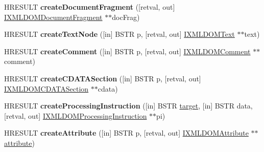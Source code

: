 \begin{DoxyCompactItemize}
H\+R\+E\+S\+U\+LT {\bfseries create\+Document\+Fragment} (\mbox{[}retval, out\mbox{]} \hyperlink{interface_m_s_x_m_l2_1_1_i_x_m_l_d_o_m_document_fragment}{I\+X\+M\+L\+D\+O\+M\+Document\+Fragment} $\ast$$\ast$doc\+Frag)
\item 
\mbox{\label{interface_m_s_x_m_l2_1_1_i_x_m_l_d_o_m_document_ac4424718d50e4d0721b1f1a271591a87}} 
H\+R\+E\+S\+U\+LT {\bfseries create\+Text\+Node} (\mbox{[}in\mbox{]} B\+S\+TR p, \mbox{[}retval, out\mbox{]} \hyperlink{interface_m_s_x_m_l2_1_1_i_x_m_l_d_o_m_text}{I\+X\+M\+L\+D\+O\+M\+Text} $\ast$$\ast$text)
\item 
\mbox{\label{interface_m_s_x_m_l2_1_1_i_x_m_l_d_o_m_document_ad999e03cc035339b43c70ee55877a536}} 
H\+R\+E\+S\+U\+LT {\bfseries create\+Comment} (\mbox{[}in\mbox{]} B\+S\+TR p, \mbox{[}retval, out\mbox{]} \hyperlink{interface_m_s_x_m_l2_1_1_i_x_m_l_d_o_m_comment}{I\+X\+M\+L\+D\+O\+M\+Comment} $\ast$$\ast$comment)
\item 
\mbox{\label{interface_m_s_x_m_l2_1_1_i_x_m_l_d_o_m_document_a4c3f3fd68e389ad8d831ea4e7c33e123}} 
H\+R\+E\+S\+U\+LT {\bfseries create\+C\+D\+A\+T\+A\+Section} (\mbox{[}in\mbox{]} B\+S\+TR p, \mbox{[}retval, out\mbox{]} \hyperlink{interface_m_s_x_m_l2_1_1_i_x_m_l_d_o_m_c_d_a_t_a_section}{I\+X\+M\+L\+D\+O\+M\+C\+D\+A\+T\+A\+Section} $\ast$$\ast$cdata)
\item 
\mbox{\label{interface_m_s_x_m_l2_1_1_i_x_m_l_d_o_m_document_aaf9b8b55a819b6e810c40a69a6476ccf}} 
H\+R\+E\+S\+U\+LT {\bfseries create\+Processing\+Instruction} (\mbox{[}in\mbox{]} B\+S\+TR \hyperlink{interfacevoid}{target}, \mbox{[}in\mbox{]} B\+S\+TR data, \mbox{[}retval, out\mbox{]} \hyperlink{interface_m_s_x_m_l2_1_1_i_x_m_l_d_o_m_processing_instruction}{I\+X\+M\+L\+D\+O\+M\+Processing\+Instruction} $\ast$$\ast$pi)
\item 
\mbox{\label{interface_m_s_x_m_l2_1_1_i_x_m_l_d_o_m_document_aecc3a765691fdd330fd5d54ae67e1319}} 
H\+R\+E\+S\+U\+LT {\bfseries create\+Attribute} (\mbox{[}in\mbox{]} B\+S\+TR p, \mbox{[}retval, out\mbox{]} \hyperlink{interface_m_s_x_m_l2_1_1_i_x_m_l_d_o_m_attribute}{I\+X\+M\+L\+D\+O\+M\+Attribute} $\ast$$\ast$\hyperlink{structattribute}{attribute})

\end{DoxyCompactItemize}
